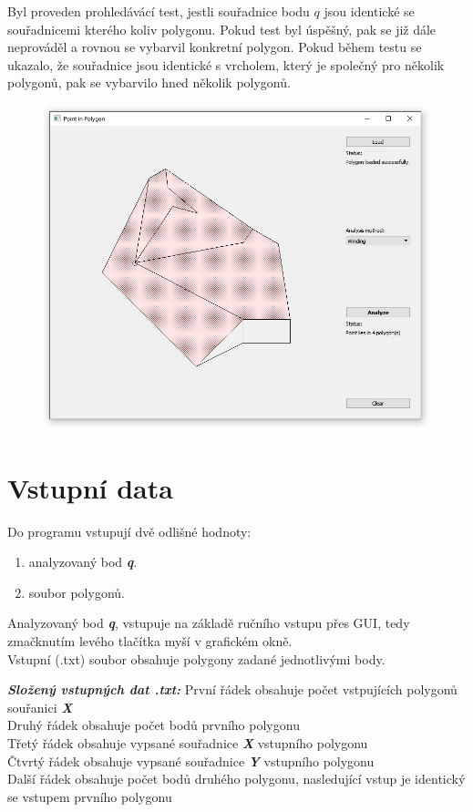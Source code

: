 \documentclass{article}
\begin{document}
Byl proveden prohledávácí test, jestli souřadnice bodu  $q$ jsou identické se souřadnicemi kterého koliv polygonu. Pokud test byl úspěšný, pak se již dále neprováděl a rovnou se vybarvil konkretní polygon. Pokud během testu se ukazalo, že souřadnice jsou identické s vrcholem, který je společný pro několik polygonů, pak se vybarvilo hned několik polygonů.
\begin{figure}[htbp]
\centering
        \includegraphics[clip, trim=0cm 0cm 0cm 0cm, width=1\textwidth]{more.jpg}
\end{figure}

\section{Vstupní data}
Do programu vstupují dvě odlišné hodnoty: 
\begin{enumerate} 
\item analyzovaný bod \textit{\textbf {q}}. 
\item soubor polygonů. 
\end{enumerate} 

Analyzovaný bod \textit{\textbf {q}}, vstupuje na základě ručního vstupu přes GUI, tedy zmačknutím levého tlačítka myší v grafickém okně.
\\
Vstupní (.txt) soubor obsahuje polygony zadané jednotlivými body.

\bigskip 

 \textit{\textbf {Složený vstupných dat .txt:}}
První řádek obsahuje počet vstpujících polygonů souřanici \textit{\textbf {X}}
\\
Druhý řádek obsahuje počet bodů prvního polygonu
\\
Třetý řádek obsahuje vypsané souřadnice  \textit{\textbf {X}} vstupního polygonu
\\
Čtvrtý řádek obsahuje vypsané souřadnice  \textit{\textbf {Y}} vstupního polygonu
\bigskip 
\\
Další řádek obsahuje počet bodů druhého polygonu, nasledující vstup je identický se vstupem prvního polygonu
\bigskip 
\end{document}
